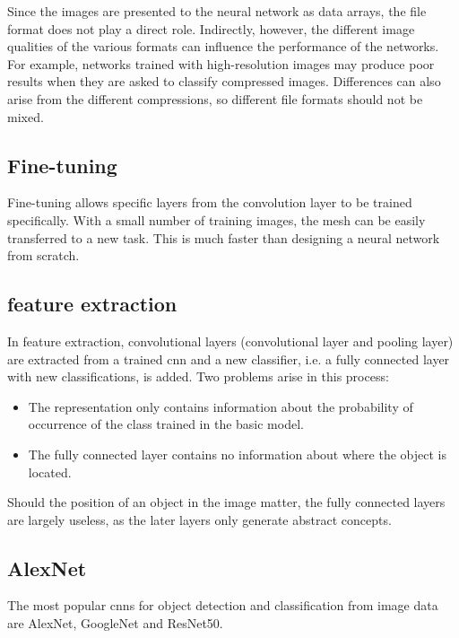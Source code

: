 Since the images are presented to the neural network as data arrays, the file format does not play a direct role. Indirectly, however, the different image qualities of the various formats can influence the performance of the networks. For example, networks trained with high-resolution images may produce poor results when they are asked to classify compressed images. \cite{Dodge:2016}Differences can also arise from the different compressions, so different file formats should not be mixed.

\subsection{Fine-tuning}

Fine-tuning allows specific layers from the convolution layer to be trained specifically. With a small number of training images, the mesh can be easily transferred to a new task. This is much faster than designing a neural network from scratch. \cite{Chollet:2018}		

\subsection{feature extraction}

In feature extraction, convolutional layers (convolutional layer and pooling layer) are extracted from a trained \ac{cnn} and a new classifier, i.e. a fully connected layer with new classifications, is added. Two problems arise in this process:

\begin{itemize}
    \item The representation only contains information about the probability of occurrence of the class trained in the basic model.
    \item The fully connected layer contains no information about where the object is located.
\end{itemize}
	
Should the position of an object in the image matter, the fully connected layers are largely useless, as the later layers only generate abstract concepts. \cite{Chollet:2018}

\subsection{AlexNet}
The most popular \ac{cnn}s for object detection and classification from image data are AlexNet, GoogleNet and ResNet50. \cite{Sharma:2018}

